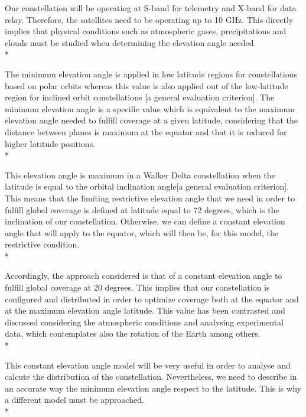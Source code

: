 \documentclass{article}
\begin{document}
Our constellation will be operating at S-band for telemetry and X-band for data relay. Therefore, the satellites need to be operating up to 10 GHz. This directly implies that physical conditions such as atmospheric gases, precipitations and clouds must be studied when determining the elevation angle needed. \\*

The minimum elevation angle is applied in low latitude regions for constellations based on polar orbits whereas this value is also applied out of the low-latitude region for inclined orbit constellations [a general evaluation criterion]. The minimum elevation angle is a specific value which is equivalent to the maximum elevation angle needed to fulfill coverage at a given latitude, considering that the distance between planes is maximum at the equator and that it is reduced for higher latitude positions.\\*

This elevation angle is maximum in a Walker Delta constellation when the latitude is equal to the orbital inclination angle[a general evaluation criterion]. This means that the limiting restrictive elevation angle that we need in order to fulfill global coverage is defined at latitude equal to 72 degrees, which is the inclination of our constellation. Otherwise, we can define a constant elevation angle that will apply to the equator, which will then be, for this model, the restrictive condition. \\*

Accordingly, the approach considered is that of a constant elevation angle to fulfill global coverage at 20 degrees. This implies that our constellation is configured and distributed in order to optimize coverage both at the equator and at the maximum elevation angle latitude. This value has been contrasted and discussed considering the atmospheric conditions and analysing experimental data, which contemplates also the rotation of the Earth among others. \\*

This constant elevation angle model will be very useful in order to analyse and calcute the distribution of the constellation. Nevertheless, we need to describe in an accurate way the minimum elevation angle respect to the latitude. This is why a different model must be approached. \\*
\end{document}
